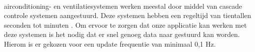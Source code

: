 \newline
\\
airconditioning- en ventilatiesystemen werken meestal door middel van cascade controle systemen aangestuurd. Deze systemen hebben een regeltijd van tientallen seconden tot minuten \cite{Wang2008}. Om ervoor te zorgen dat onze applicatie kan werken met deze systemen is het nodig dat er snel genoeg data naar gestuurd kan worden. Hierom is er gekozen voor een update frequentie van minimaal 0,1 Hz.